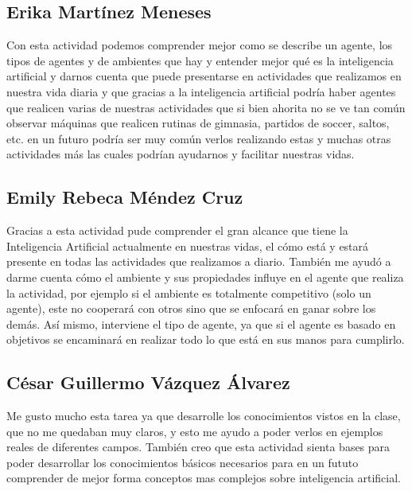\documentclass{article}
\begin{document}
        \subsection{Erika Martínez Meneses}
            Con esta actividad podemos comprender mejor como se describe un agente, los tipos de agentes y de ambientes que hay y entender mejor qué es la inteligencia artificial y darnos cuenta que puede presentarse en actividades que realizamos en nuestra vida diaria y que gracias a la inteligencia artificial podría haber agentes que realicen varias de nuestras actividades que si bien ahorita no se ve tan común observar máquinas que realicen rutinas de gimnasia, partidos de soccer, saltos, etc. en un futuro podría ser  muy común verlos realizando estas y muchas otras actividades más las cuales podrían ayudarnos y facilitar nuestras vidas.

        \subsection{Emily Rebeca Méndez Cruz}
            Gracias a esta actividad pude comprender el gran alcance que tiene la Inteligencia Artificial actualmente en nuestras vidas, el cómo está y estará presente en todas las actividades que realizamos a diario. También me ayudó a darme cuenta cómo el ambiente y sus propiedades influye en el agente que realiza la actividad, por ejemplo si el ambiente es totalmente competitivo (solo un agente), este no cooperará con otros sino que se enfocará en ganar sobre los demás. Así mismo, interviene el tipo de agente, ya que si el agente es basado en objetivos se encaminará en realizar todo lo que está en sus manos para cumplirlo.


        \subsection{César Guillermo Vázquez Álvarez}
            Me gusto mucho esta tarea ya que desarrolle los conocimientos vistos en la clase, que no me quedaban muy claros, y esto me ayudo a poder verlos en ejemplos reales de diferentes campos. También creo que esta actividad sienta bases para poder desarrollar los conocimientos básicos necesarios para en un fututo comprender de mejor forma conceptos mas complejos sobre inteligencia artificial.
\end{document}
